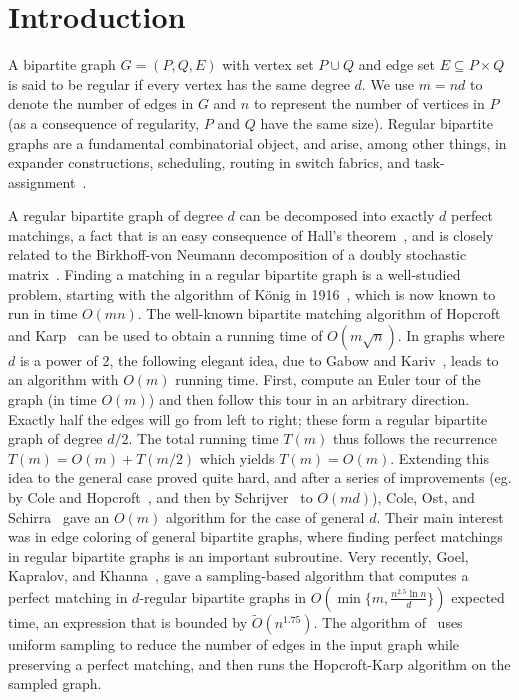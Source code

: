 \documentclass[11pt]{article}
\begin{document}
\section{Introduction}

A bipartite graph $G = (P, Q, E)$ with vertex set $P \cup Q$ and edge set $E
\subseteq P \times Q$ is said to be regular if every vertex has the same
degree $d$. We use $m=nd$ to denote the number of edges in $G$ and $n$ to
represent the number of vertices in $P$ (as a consequence of regularity, $P$
and $Q$ have the same size). Regular bipartite graphs are a fundamental
combinatorial object, and arise, among other things, in expander
constructions, scheduling, routing in switch fabrics, and
task-assignment~\cite{mr:random,amsz:color2003,cos:regular2001}.

A regular bipartite graph of degree $d$ can be decomposed into exactly $d$
perfect matchings, a fact that is an easy consequence of Hall's
theorem~\cite{b:graphtheory}, and is closely related to the Birkhoff-von
Neumann decomposition of a doubly stochastic matrix~\cite{b:bvn46,vn:bvn53}.
Finding a matching in a regular bipartite graph is a well-studied problem,
starting with the algorithm of K\"{o}nig in 1916~\cite{k:regular16}, which is
now known to run in time $O(mn)$. The well-known bipartite matching algorithm
of Hopcroft and Karp~\cite{hk:match73} can be used to obtain a running time of
$O(m\sqrt n)$. In graphs where $d$ is a power of 2, the following elegant
idea, due to Gabow and Kariv~\cite{gk:edge1982}, leads to an algorithm with
$O(m)$ running time. First, compute an Euler tour of the graph (in time
$O(m)$) and then follow this tour in an arbitrary direction. Exactly half the
edges will go from left to right; these form a regular bipartite graph of
degree $d/2$. The total running time $T(m)$ thus follows the recurrence $T(m)
= O(m) + T(m/2)$ which yields $T(m) = O(m)$. Extending this idea to the
general case proved quite hard, and after a series of improvements (eg. by
Cole and Hopcroft~\cite{ch:color82}, and then by Schrijver~\cite{s:color99} to
$O(md)$), Cole, Ost, and Schirra~\cite{cos:regular2001} gave an $O(m)$
algorithm for the case of general $d$. Their main interest was in edge
coloring of general bipartite graphs, where finding perfect matchings in
regular bipartite graphs is an important
subroutine.
Very recently, Goel, Kapralov, and Khanna~\cite{gkk:rbp08}, gave a
sampling-based algorithm that computes a perfect matching in $d$-regular
bipartite graphs in $O(\min\{m, \frac{n^{2.5}\ln n}{d}\})$ expected time, an
expression that is bounded by $\tilde{O}(n^{1.75})$.  The algorithm
of~\cite{gkk:rbp08} uses uniform sampling to reduce the number of edges in the
input graph while preserving a perfect matching, and then runs the
Hopcroft-Karp algorithm on the sampled graph.
\end{document}
